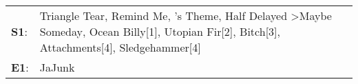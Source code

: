 \begin{supertabular}{p{0.03\textwidth}p{0.92\textwidth}}
 \textbf{S1}:  &  Triangle Tear\textsuperscript{}, \enspace Remind Me\textsuperscript{}, 's Theme\textsuperscript{}, \enspace Half Delayed\textsuperscript{} \textgreater \enspace Maybe Someday\textsuperscript{}, \enspace Ocean Billy[1]\textsuperscript{}, \enspace Utopian Fir[2]\textsuperscript{}, \enspace Bitch[3]\textsuperscript{}, \enspace Attachments[4]\textsuperscript{}, \enspace Sledgehammer[4]\textsuperscript{}  \enspace  \\
 \textbf{E1}:  &                                                                                                                                                                                                                                                                                                                                                                                                       JaJunk\textsuperscript{}  \enspace  \\
\end{supertabular}
